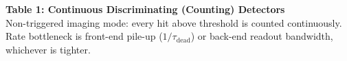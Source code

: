 \documentclass[10pt]{article}
\renewcommand{\arraystretch}{1.25}
\begin{document}
\begin{center}
{\Large\bfseries Table 1: Continuous Discriminating (Counting) Detectors}\\[4pt]
{\small Non-triggered imaging mode: every hit above threshold is counted continuously.
Rate bottleneck is front-end pile-up ($1/\tau_\mathrm{dead}$) or back-end readout bandwidth, whichever is tighter.}
\end{center}

\vspace{4pt}

\scriptsize
\renewcommand{\arraystretch}{1.12}
\setlength{\tabcolsep}{2.0pt}
\setlength{\LTcapwidth}{\textwidth}
\end{document}
